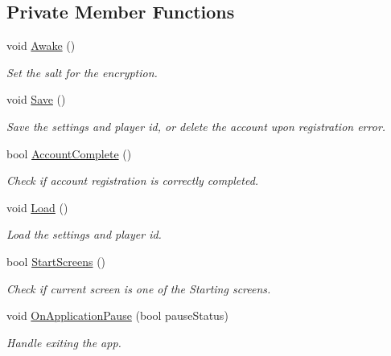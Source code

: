 \subsection*{Private Member Functions}
\begin{DoxyCompactItemize}
\item 
\mbox{\label{class_pause_manager_a655b826847bdc4c8721d35aa47a4c880}} 
void \mbox{\hyperlink{class_pause_manager_a655b826847bdc4c8721d35aa47a4c880}{Awake}} ()
\begin{DoxyCompactList}\small\item\em Set the salt for the encryption. \end{DoxyCompactList}\item 
\mbox{\label{class_pause_manager_a0150346b902b664ce65d5e1b840d9d4d}} 
void \mbox{\hyperlink{class_pause_manager_a0150346b902b664ce65d5e1b840d9d4d}{Save}} ()
\begin{DoxyCompactList}\small\item\em Save the settings and player id, or delete the account upon registration error. \end{DoxyCompactList}\item 
\mbox{\label{class_pause_manager_a3afaaf8ca6d30581f6df12d900d0e1b5}} 
bool \mbox{\hyperlink{class_pause_manager_a3afaaf8ca6d30581f6df12d900d0e1b5}{Account\+Complete}} ()
\begin{DoxyCompactList}\small\item\em Check if account registration is correctly completed. \end{DoxyCompactList}\item 
\mbox{\label{class_pause_manager_a8666e6da14b6f6b2287e34c5775e21c7}} 
void \mbox{\hyperlink{class_pause_manager_a8666e6da14b6f6b2287e34c5775e21c7}{Load}} ()
\begin{DoxyCompactList}\small\item\em Load the settings and player id. \end{DoxyCompactList}\item 
\mbox{\label{class_pause_manager_a9a9453e92a60de1d20cf37c9e55ded0d}} 
bool \mbox{\hyperlink{class_pause_manager_a9a9453e92a60de1d20cf37c9e55ded0d}{Start\+Screens}} ()
\begin{DoxyCompactList}\small\item\em Check if current screen is one of the Starting screens. \end{DoxyCompactList}\item 
\mbox{\label{class_pause_manager_adccb03eddbe4377a0153565456c92325}} 
void \mbox{\hyperlink{class_pause_manager_adccb03eddbe4377a0153565456c92325}{On\+Application\+Pause}} (bool pause\+Status)
\begin{DoxyCompactList}\small\item\em Handle exiting the app. \end{DoxyCompactList}\end{DoxyCompactItemize}
